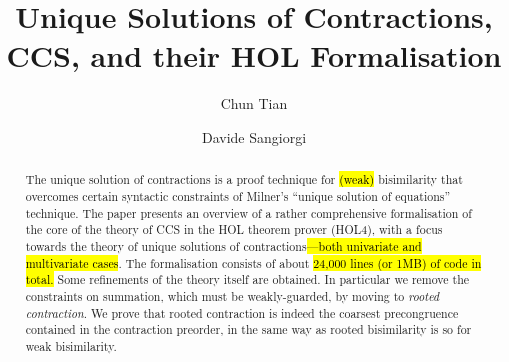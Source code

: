 \documentclass[3p,preprint]{elsarticle}
\begin{document}
\ifrebuttal
{}



\newpage
\setcounter{page}{0}
\fi

\begin{frontmatter}

\title{Unique Solutions of Contractions, CCS, and their HOL
  Formalisation}

\author[mymainaddress]{Chun Tian}%
\address[mymainaddress]{\hl{University of Trento} and Fondazione Bruno
  Kessler, Italy}

\author[mysecondaryaddress]{Davide Sangiorgi}
\address[mysecondaryaddress]{\hl{University of Bologna, Italy and INRIA, France}}

\begin{abstract}
  The unique solution of contractions is a proof technique for
  \hl{(weak)} bisimilarity that overcomes certain syntactic constraints of
  Milner's ``unique solution of equations'' technique.  The paper
  presents an overview of a rather comprehensive formalisation of the
  core of the theory of CCS in the HOL theorem prover (HOL4), with a
  focus towards the theory of unique solutions of contractions\hl{---both
  univariate and multivariate cases}.
  The formalisation consists of about \hl{24,000 lines (or 1MB) of code in total.}
  Some refinements of the theory itself are obtained.
  In particular we remove the constraints on summation,
  which must be weakly-guarded, by moving to \emph{rooted
  contraction}. We prove that 
 rooted contraction is indeed the coarsest
  precongruence contained in the contraction preorder, in the same way
  as  rooted bisimilarity is  so for weak bisimilarity.


\end{abstract}
\end{frontmatter}
\end{document}
